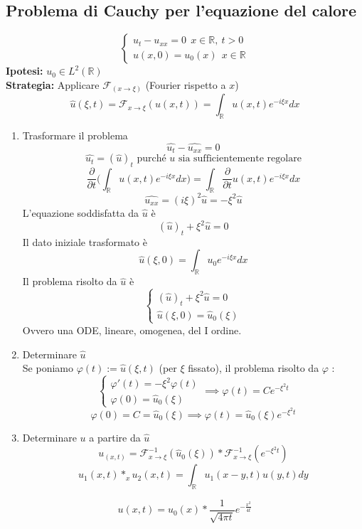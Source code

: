 \documentclass[a4paper]{article}
\newcommand{\R}{\mathbb{R}}
\begin{document}
\subsection{Problema di Cauchy per l'equazione del calore}
\[\begin{cases}
	u_t-u_{x x}=0\ \ x\in \R,\ t>0\\
	u(x,0)=u_0(x)\ \ x\in \R
\end{cases}
 \]
\textbf{Ipotesi:} $u_0\in L^{2}(\R)$ 
\\\textbf{Strategia:} Applicare $\mathcal F_{(x\to \xi)}$ (Fourier rispetto a $x$)
\[\hat{u}(\xi, t)=\mathcal F_{x\to \xi}(u(x,t))= \int_{\R}^{} u(x,t) e^{-i\xi x}dx\]
\begin{enumerate}
	\item Trasformare il problema
		\[\widehat{u_t}- \widehat{u_{x x}}=0\]
		\[\hat{u_t}=(\hat{u})_t\text{ purché }u\text{ sia sufficientemente regolare}\]
		\[\frac{\partial }{\partial t} \bigg( \int_{\R}^{} u(x,t)e^{-i\xi x}dx\bigg)= \int_{\R}^{} \frac{\partial }{\partial t} u(x,t)e^{-i\xi x}dx\]
		\[\widehat{u _{x x}}=(i\xi )^2 \hat{u}=-\xi^2 \hat{u}\]
		L'equazione soddisfatta da $\hat{u}$ è
		\[(\hat{u})_t + \xi^2 \hat{u}=0\]
		Il dato iniziale trasformato è 
		\[\hat{u}(\xi,0)=\int_{\R}^{} u_0 e^{-i\xi x}dx\]
Il problema risolto da $\hat{u}$ è
\[\begin{cases}
	(\hat{u})_t+\xi^2 \hat{u}=0\\
\hat{u}(\xi,0)=\hat{u}_0(\xi)

\end{cases}
\]
Ovvero una ODE, lineare, omogenea, del I ordine.
\item Determinare $\hat{u}$ 
	\\Se poniamo $\varphi(t):=\hat{u}(\xi, t)$ (per $\xi$ fissato), il problema risolto da $\varphi $ :
	\[\begin{cases}
		\varphi'(t)=-\xi^2 \varphi(t)\\
		\varphi(0)=\hat{u}_0(\xi)
	\end{cases}\implies \varphi(t)=C e^{-\xi^2 t}\]
	\[\varphi(0)=C=\hat{u}_0(\xi)\implies \varphi(t)=\hat{u}_0(\xi)e^{-\xi^2t}\]
\item Determinare $u$ a partire da $\hat{u}$ 
	\[u_(x,t)=\mathcal F^{-1}_{x\to \xi}(\hat{u}_0(\xi))*\mathcal F^{-1}_{x\to \xi}(e^{-\xi^2t})\]
	\[u_1(x,t)*_x u_2(x,t)= \int_{\R}^{} u_1(x-y,t)u(y,t)dy\] 
	
\end{enumerate}
\begin{tcolorbox}
	\[u(x,t)=u_0(x)*\frac{1}{\sqrt{4\pi t} }e^{- \frac{x^2}{4t}}\]
\end{tcolorbox}
\end{document}
